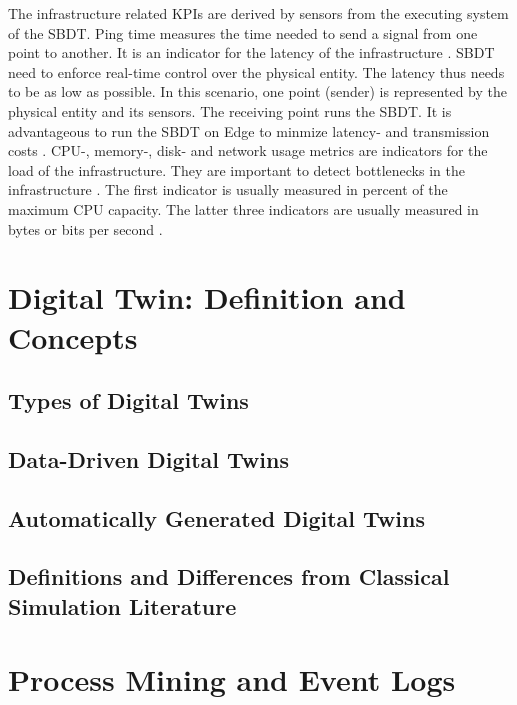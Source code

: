 The infrastructure related KPIs are derived by sensors from the executing system of the SBDT. Ping time measures the time needed to send a signal from one point to another. It is an indicator for the latency of the infrastructure \parencite{wu2021digital}. SBDT need to enforce real-time control over the physical entity. The latency thus needs to be as low as possible. In this scenario, one point (sender) is represented by the physical entity and its sensors. The receiving point runs the SBDT. It is advantageous to run the SBDT on Edge to minmize latency- and transmission costs \parencite{li2018learning}. CPU-, memory-, disk- and network usage metrics are indicators for the load of the infrastructure. They are important to detect bottlenecks in the infrastructure \parencite{li2018learning}. The first indicator is usually measured in percent of the maximum CPU capacity. The latter three indicators are usually measured in bytes or bits per second \parencite{granelli2021evaluating}.



\section{Digital Twin: Definition and Concepts}
\label{sec:digital-twin}
\subsection{Types of Digital Twins}

\subsection{Data-Driven Digital Twins}

\subsection{Automatically Generated Digital Twins}
\subsection{Definitions and Differences from Classical Simulation Literature}

\section{Process Mining and Event Logs}
\label{sec:process-mining}

